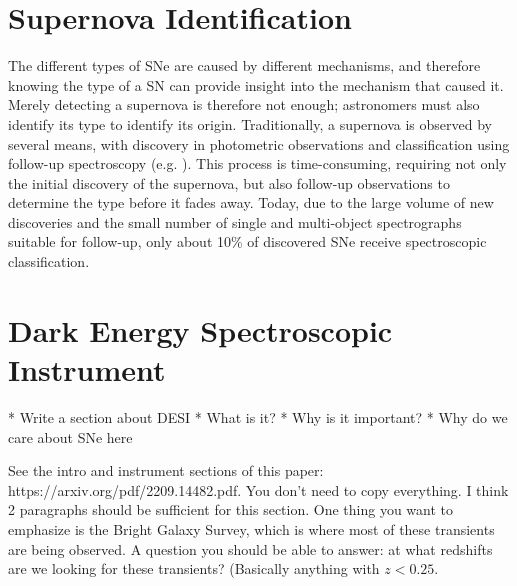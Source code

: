 \section{Supernova Identification}
\label{sec:supernova-identification}
The different types of SNe are caused by different mechanisms, and therefore 
knowing the type of a SN can provide insight into the mechanism that caused it.
Merely detecting a supernova is therefore not enough; astronomers must also identify its
type to identify its origin. Traditionally, a supernova is observed by several 
means, with discovery in photometric observations and classification using follow-up spectroscopy (e.g. \textcite{Perlmutter1999}). This process is time-consuming, requiring not only 
the initial discovery of the supernova, but also follow-up observations to determine
the type before it fades away. Today, due to the large volume of new discoveries and the small number of single and multi-object spectrographs suitable for follow-up, only about 10\% of discovered SNe receive spectroscopic classification.

\section{Dark Energy Spectroscopic Instrument}
\label{sec: DESI}
* Write a section about DESI
* What is it?
* Why is it important?
* Why do we care about SNe here

See the intro and instrument sections of this paper: https://arxiv.org/pdf/2209.14482.pdf.
You don't need to copy everything. I think 2 paragraphs should be sufficient for this section.
One thing you want to emphasize is the Bright Galaxy Survey, which is where most of these transients
are being observed. A question you should be able to answer: at what redshifts are we looking for 
these transients? (Basically anything with $z<0.25$.




